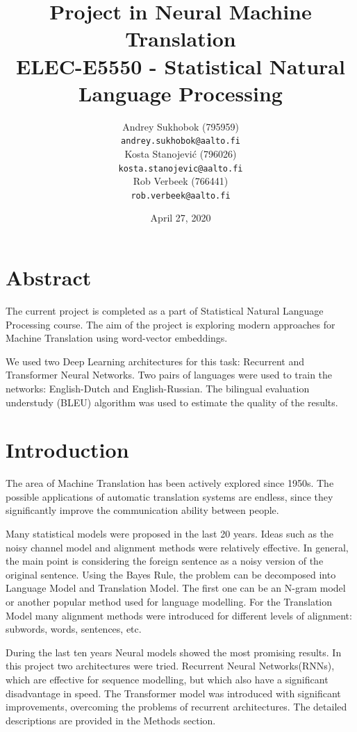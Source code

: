 \documentclass{article}
\title{
    Project in Neural Machine Translation\\
    \large ELEC-E5550 - Statistical Natural Language Processing
}
\author{
  Andrey Sukhobok (795959)\\
  \texttt{andrey.sukhobok@aalto.fi}
  \\[3ex]
  Kosta Stanojević (796026)\\
  \texttt{kosta.stanojevic@aalto.fi}
  \\[3ex]
  Rob Verbeek (766441)\\
  \texttt{rob.verbeek@aalto.fi}
}
\date{April 27, 2020}
\begin{document}
\maketitle

\section*{Abstract}

The current project is completed as a part of Statistical Natural Language Processing course. The aim of the project is exploring modern approaches for Machine Translation using word-vector embeddings.

We used two Deep Learning architectures for this task: Recurrent and Transformer Neural Networks. Two pairs of languages were used to train the networks: English-Dutch and English-Russian. The bilingual evaluation understudy (BLEU) algorithm was used to estimate the quality of the results.

\newpage


\section*{Introduction}

The area of Machine Translation has been actively explored since 1950s. The possible applications of automatic translation systems are endless, since they significantly improve the communication ability between people.

Many statistical models were proposed in the last 20 years. Ideas such as the noisy channel model and alignment methods were relatively effective. In general, the main point is considering the foreign sentence as a noisy version of the original sentence. Using the Bayes Rule, the problem can be decomposed into Language Model and Translation Model. The first one can be an N-gram model or another popular method used for language modelling. For the Translation Model many alignment methods were introduced for different levels of alignment: subwords, words, sentences, etc.

During the last ten years Neural models showed the most promising results. In this project two architectures were tried. Recurrent Neural Networks(RNNs), which are effective for sequence modelling, but which also have a significant disadvantage in speed. The Transformer model was introduced with significant improvements, overcoming the problems of recurrent architectures. The detailed descriptions are provided in the Methods section.
\end{document}
